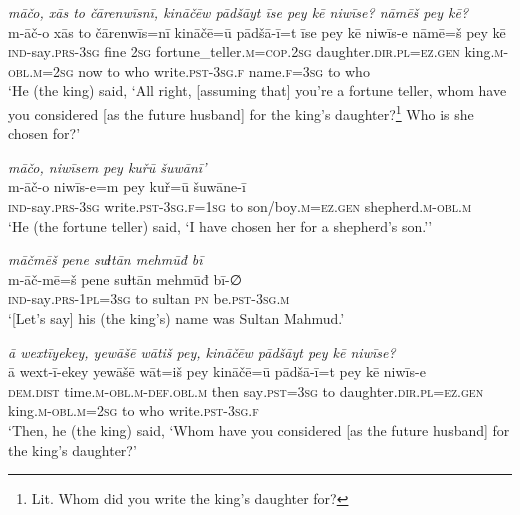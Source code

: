 \ea \label{KŠ.12}
\textit{māčo, xās to čārenwīsnī, kināčēw pādšāyt īse pey kē niwīse? nāmēš pey kē?} \\ 
\gll m-āč-o xās to čārenwīs=nī kināčē=ū pādšā-ī=t īse pey kē niwīs-e nāmē=š pey kē \\ 
 \textsc{ind-}say\textsc{.prs}\textsc{-3sg} fine \textsc{2sg} fortune\_teller\textsc{.m}\textsc{=cop}\textsc{.\textsc{2sg}} daughter\textsc{.dir}\textsc{.pl}\textsc{=ez.gen} king\textsc{.m}\textsc{-obl}\textsc{.m}\textsc{=\textsc{2sg}} now to who write\textsc{.pst}\textsc{-3sg}\textsc{.f} name\textsc{.f}\textsc{=3sg} to who \\ 
\glt `He (the king) said, ‘All right, [assuming that] you’re a fortune teller, whom have you considered [as the future husband] for the king’s daughter?\footnote{Lit. Whom did you write the king’s daughter for?} Who is she chosen for?'
\z 
 
\ea \label{KŠ.13}
\textit{māčo, niwīsem pey kuřū šuwānī’} \\ 
\gll m-āč-o niwīs-e=m pey kuř=ū šuwāne-ī \\ 
 \textsc{ind-}say\textsc{.prs}\textsc{-3sg} write\textsc{.pst}\textsc{-3sg}\textsc{.f}\textsc{=\textsc{1sg}} to son/boy\textsc{.m}\textsc{=ez.gen} shepherd\textsc{.m}\textsc{-obl}\textsc{.m} \\ 
\glt `He (the fortune teller) said, ‘I have chosen her for a shepherd’s son.’'
\z 
 
\ea \label{KŠ.14}
\textit{māčmēš pene suɫtān mehmūđ bī} \\ 
\gll m-āč-mē=š pene suɫtān mehmūđ bī-∅ \\ 
 \textsc{ind-}say\textsc{.prs}\textsc{-\textsc{1pl}}\textsc{=3sg} to sultan \textsc{pn} be\textsc{.pst}\textsc{-3sg}\textsc{.m} \\ 
\glt `[Let’s say] his (the king's) name was Sultan Mahmud.'
\z 
 
\ea \label{KŠ.15}
\textit{ā wextīyekey, yewāšē wātiš pey, kināčēw pādšāyt pey kē niwīse?} \\ 
\gll ā wext-ī-ekey yewāšē wāt=iš pey kināčē=ū pādšā-ī=t pey kē niwīs-e \\ 
 \textsc{dem.dist} time\textsc{.m}\textsc{-obl}\textsc{.m}\textsc{-def}\textsc{.obl}\textsc{.m} then say\textsc{.pst}\textsc{=3sg} to daughter\textsc{.dir}\textsc{.pl}\textsc{=ez.gen} king\textsc{.m}\textsc{-obl}\textsc{.m}\textsc{=\textsc{2sg}} to who write\textsc{.pst}\textsc{-3sg}\textsc{.f} \\ 
\glt `Then, he (the king) said, ‘Whom have you considered [as the future husband] for the king’s daughter?'
\z 
 
